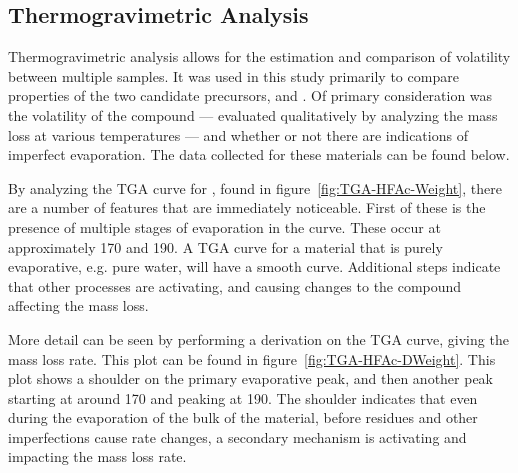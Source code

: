 
\subsection{Thermogravimetric Analysis}

Thermogravimetric analysis allows for the estimation and comparison of volatility between multiple samples. It was used in this study primarily to compare properties of the two candidate precursors, \HFAc{} and \TMHD{}. Of primary consideration was the volatility of the compound --- evaluated qualitatively by analyzing the mass loss at various temperatures --- and whether or not there are indications of imperfect evaporation. The data collected for these materials can be found below. 

By analyzing the TGA curve for \HFAc{}, found in figure~\vref{fig:TGA-HFAc-Weight}, there are a number of features that are immediately noticeable. First of these is the presence of multiple stages of evaporation in the curve. These occur at approximately 170 and 190\degC{}. A TGA curve for a material that is purely evaporative, e.g. pure water, will have a smooth curve. Additional steps indicate that other processes are activating, and causing changes to the compound affecting the mass loss. 

More detail can be seen by performing a derivation on the TGA curve, giving the mass loss rate. This plot can be found in figure~\vref{fig:TGA-HFAc-DWeight}. This plot shows a shoulder on the primary evaporative peak, and then another peak starting at around 170\degC{} and peaking at 190\degC{}. The shoulder indicates that even during the evaporation of the bulk of the material, before residues and other imperfections cause rate changes, a secondary mechanism is activating and impacting the mass loss rate. 

